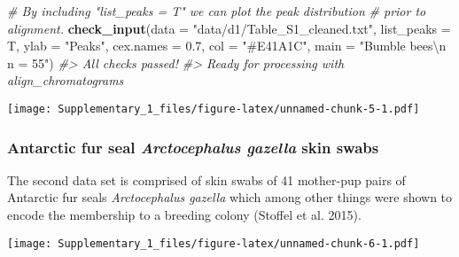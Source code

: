 \documentclass[]{article}
\newenvironment{Shaded}{}{}
\newcommand{\KeywordTok}[1]{\textbf{{#1}}}
\newcommand{\DataTypeTok}[1]{\textcolor[rgb]{0.50,0.00,0.00}{{#1}}}
\newcommand{\FloatTok}[1]{\textcolor[rgb]{0.50,0.00,0.50}{{#1}}}
\newcommand{\CharTok}[1]{\textcolor[rgb]{1.00,0.00,1.00}{{#1}}}
\newcommand{\StringTok}[1]{\textcolor[rgb]{0.87,0.00,0.00}{{#1}}}
\newcommand{\CommentTok}[1]{\textcolor[rgb]{0.50,0.50,0.50}{\textit{{#1}}}}
\newcommand{\NormalTok}[1]{{#1}}
\begin{document}
\begin{Shaded}
\begin{Highlighting}[]
\CommentTok{# By including "list_peaks = T" we can plot the peak distribution }
\CommentTok{# prior to alignment.}
\KeywordTok{check_input}\NormalTok{(}\DataTypeTok{data =} \StringTok{"data/d1/Table_S1_cleaned.txt"}\NormalTok{, }\DataTypeTok{list_peaks =} \NormalTok{T,}
            \DataTypeTok{ylab =} \StringTok{"Peaks"}\NormalTok{, }\DataTypeTok{cex.names =} \FloatTok{0.7}\NormalTok{, }\DataTypeTok{col =} \StringTok{"#E41A1C"}\NormalTok{,}
            \DataTypeTok{main =} \StringTok{"Bumble bees}\CharTok{\textbackslash{}n}\StringTok{ n = 55"}\NormalTok{)}
\CommentTok{#> All checks passed!}
\CommentTok{#> Ready for processing with align_chromatograms}
\end{Highlighting}
\end{Shaded}

\texttt{[image: Supplementary\_1\_files/figure-latex/unnamed-chunk-5-1.pdf]}

\subsubsection{\texorpdfstring{Antarctic fur seal \emph{Arctocephalus
gazella} skin
swabs}{Antarctic fur seal Arctocephalus gazella skin swabs}}\label{antarctic-fur-seal-arctocephalus-gazella-skin-swabs}

The second data set is comprised of skin swabs of 41 mother-pup pairs of
Antarctic fur seals \emph{Arctocephalus gazella} which among other
things were shown to encode the membership to a breeding colony (Stoffel
et al. 2015).

\begin{Shaded}
\end{Shaded}

\texttt{[image: Supplementary\_1\_files/figure-latex/unnamed-chunk-6-1.pdf]}
\end{document}
